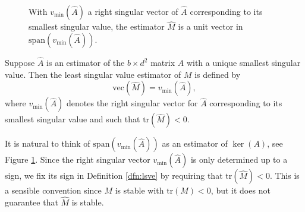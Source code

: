 \documentclass{biometrika}
\begin{document}
\begin{figure}
\centering
{}
    \caption{With $v_{\min}(\hat{A})$ a right singular vector of $\hat{A}$ corresponding to its smallest singular value, the estimator $\hat{M}$ is a unit vector in $\mathrm{span}(v_{\min}(\hat{A}))$.   
    \label{fig:estimator}}
\end{figure}

\begin{definition} \label{dfn:lsve}
Suppose $\hat{A}$ is an estimator of the $b \times d^2$ matrix $A$ with 
a unique smallest singular value. Then the least singular value estimator of $M$ is defined by 
\begin{equation}
    \label{eq:lsve}
    \mathrm{vec}(\hat{M}) = v_{\min}(\hat{A}),
\end{equation}
where $v_{\min}(\hat{A})$ denotes the right singular vector for $\hat{A}$ corresponding to its 
smallest singular value and such that $\mathrm{tr}(\hat{M}) < 0$.
\end{definition}

It is natural to think of $\mathrm{span}(v_{\min}(\hat{A}))$ as an estimator of $\ker(A)$, see 
Figure \ref{fig:estimator}. Since the right singular vector $v_{\min}(\hat{A})$ is only determined 
up to a sign, we fix its sign in Definition \ref{dfn:lsve} by requiring that $\mathrm{tr}(\hat{M}) < 0$.
This is a sensible convention since $M$ is stable with $\mathrm{tr}(M) < 0$, but it does not 
guarantee that $\hat{M}$ is stable. 
\end{document}
